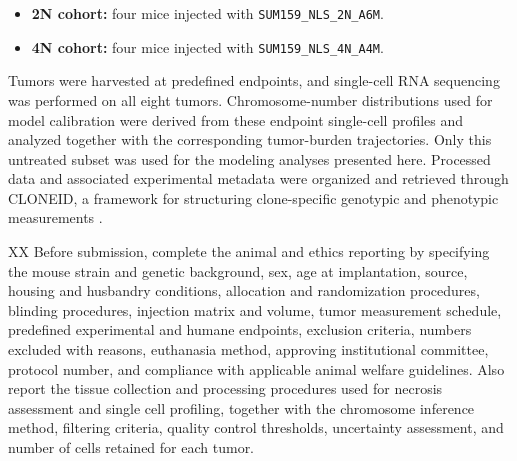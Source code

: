 \documentclass[11pt]{article}
\begin{document}
\begin{itemize}
\item \textbf{2N cohort:} four mice injected with \texttt{SUM159\_NLS\_2N\_A6M}.
\item \textbf{4N cohort:} four mice injected with \texttt{SUM159\_NLS\_4N\_A4M}.
\end{itemize}

Tumors were harvested at predefined endpoints, and single-cell RNA sequencing was performed on all eight tumors. Chromosome-number distributions used for model calibration were derived from these endpoint single-cell profiles and analyzed together with the corresponding tumor-burden trajectories. Only this untreated subset was used for the modeling analyses presented here. Processed data and associated experimental metadata were organized and retrieved through CLONEID, a framework for structuring clone-specific genotypic and phenotypic measurements \cite{veith_cloneid_2025}.

XX Before submission, complete the animal and ethics reporting by specifying the mouse strain and genetic background, sex, age at implantation, source, housing and husbandry conditions, allocation and randomization procedures, blinding procedures, injection matrix and volume, tumor measurement schedule, predefined experimental and humane endpoints, exclusion criteria, numbers excluded with reasons, euthanasia method, approving institutional committee, protocol number, and compliance with applicable animal welfare guidelines. Also report the tissue collection and processing procedures used for necrosis assessment and single cell profiling, together with the chromosome inference method, filtering criteria, quality control thresholds, uncertainty assessment, and number of cells retained for each tumor.







\clearpage


\end{document}

